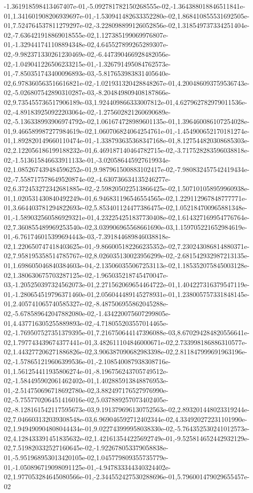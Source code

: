 -1.361918598413467407e-01,-5.092781782150268555e-02,-1.364388018846511841e-01,1.341601908206939697e-01,-1.530941482633352280e-02,1.868410855531692505e-01,7.524764537811279297e-02,-3.228098899126052856e-02,1.318549737334251404e-02,-7.636421918869018555e-02,1.127385199069976807e-01,-1.329441741108894348e-02,4.645527899265289307e-02,-9.982371330261230469e-02,-6.447390466928482056e-02,-1.049041226506233215e-01,-1.326791495084762573e-01,-7.850351743400096893e-03,-5.817653983831405640e-02,6.978360563516616821e-02,-1.021931320428848267e-01,4.200486093759536743e-02,-5.026807542890310287e-03,-8.204849809408187866e-02,9.735455736517906189e-03,1.924409866333007812e-01,4.627962782979011536e-02,-4.891839250922203064e-02,-1.275602821260690689e-02,-5.136338993906974792e-02,1.061674728989601135e-01,1.396460086107254028e-01,9.466589987277984619e-02,1.060706824064254761e-01,-1.454900652170181274e-01,1.892820149660110474e-01,-1.338793635368347168e-01,8.127544820308685303e-02,2.122056186199188232e-01,6.469187140464782715e-02,-3.717528283596038818e-02,-1.513615846633911133e-01,-3.020586445927619934e-02,1.085267439484596252e-01,9.987961500883102417e-02,-7.980832457542419434e-02,-7.558717578649520874e-02,-4.630736634135246277e-02,6.372453272342681885e-02,-2.598205022513866425e-02,1.507101058959960938e-01,1.020531430840492249e-01,6.946831196546554565e-02,1.229112967848777771e-01,3.664403781294822693e-02,5.853401124477386475e-02,1.052184700965881348e-01,-1.589032560586929321e-01,4.232254251837730408e-02,1.614327169954776764e-02,7.360855489969253540e-02,3.039906965568661690e-03,1.159705221652984619e-01,-6.761746015399694443e-03,-7.391844689846038818e-02,1.220650747418403625e-01,-9.866005182266235352e-02,7.230243086814880371e-02,7.958195358514785767e-02,8.026035130023956299e-02,-2.681542932987213135e-01,1.698605046840384603e-04,-2.135060355067253113e-02,1.185352075845003128e-02,1.380630675703287125e-02,-1.965035218745470047e-03,-1.205250397324562073e-01,2.271562069654464722e-01,1.404227316379547119e-01,-1.280654519796371460e-01,2.056044489145278931e-01,1.238005757331848145e-01,2.405741065740585327e-02,-8.487506955862045288e-02,-5.678589642047882080e-02,-1.434220075607299805e-01,4.437716305255889893e-02,-4.718055203557014465e-02,-1.769507527351379395e-01,7.216750644147396088e-03,8.670294284820556641e-02,1.797743439674377441e-01,3.482611104846000671e-02,2.733998186886310577e-02,1.443277206271886826e-02,3.906387090682983398e-02,2.811847999691963196e-02,-1.578651219606399536e-01,-2.108540087938308716e-01,1.561254411935806274e-01,-8.196756243705749512e-02,-1.584495902061462402e-01,1.402885913848876953e-01,-2.514750696718692780e-02,3.882497176527976990e-02,-5.755770206451416016e-02,5.037889257073402405e-02,-8.128161542117595673e-03,9.191379696130752563e-02,2.893201448023319244e-02,7.046603132039308548e-03,6.969046592712402344e-02,4.334920272231101990e-02,1.949490904808044434e-01,9.022743999958038330e-02,-5.764352530241012573e-02,4.128433391451835632e-02,1.421613544225692749e-01,-9.525814652442932129e-02,7.519820332527160645e-02,-1.922678053379058838e-01,-5.951968953013420105e-02,1.045779809355735779e-01,-1.050896719098091125e-01,-4.947833344340324402e-02,1.977053284645080566e-01,-2.344552427530288696e-01,5.796001479029655457e-02
